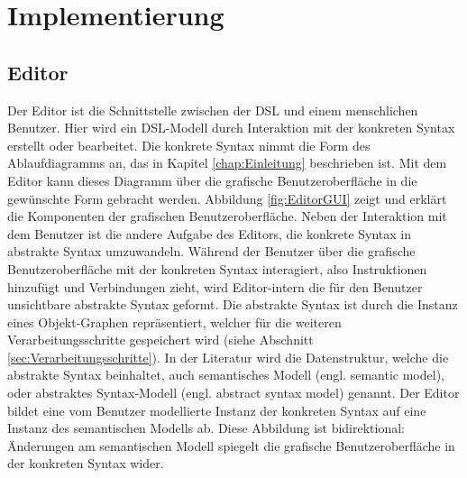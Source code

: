\chapter{Implementierung}
\label{chap:Implementierung}

\section{Editor}
\label{sec:Editor}
Der Editor ist die Schnittstelle zwischen der DSL und einem menschlichen Benutzer. Hier wird ein DSL-Modell durch Interaktion mit der konkreten Syntax erstellt oder bearbeitet. Die konkrete Syntax nimmt die Form des Ablaufdiagramms an, das in Kapitel \ref{chap:Einleitung} beschrieben ist. Mit dem Editor kann dieses Diagramm über die grafische Benutzeroberfläche in die gewünschte Form gebracht werden. Abbildung \ref{fig:EditorGUI} zeigt und erklärt die Komponenten der grafischen Benutzeroberfläche.
\newline 
Neben der Interaktion mit dem Benutzer ist die andere Aufgabe des Editors, die konkrete Syntax in abstrakte Syntax umzuwandeln. Während der Benutzer über die grafische Benutzeroberfläche mit der konkreten Syntax interagiert, also Instruktionen hinzufügt und Verbindungen zieht, wird Editor-intern die für den Benutzer unsichtbare abstrakte Syntax geformt. Die abstrakte Syntax ist durch die Instanz eines Objekt-Graphen repräsentiert, welcher für die weiteren Verarbeitungsschritte gespeichert wird (siehe Abschnitt \ref{sec:Verarbeitungsschritte}). In der Literatur wird die Datenstruktur, welche die abstrakte Syntax beinhaltet, auch semantisches Modell (engl. semantic model)\cite[S. 159ff]{Fowler:11}, oder abstraktes Syntax-Modell (engl. abstract syntax model)\cite[S. 78ff]{Kleppe:09} genannt. Der Editor bildet eine vom Benutzer modellierte Instanz der konkreten Syntax auf eine Instanz des semantischen Modells ab. Diese Abbildung ist bidirektional: Änderungen am semantischen Modell spiegelt die grafische Benutzeroberfläche in der konkreten Syntax wider. 
\newline
